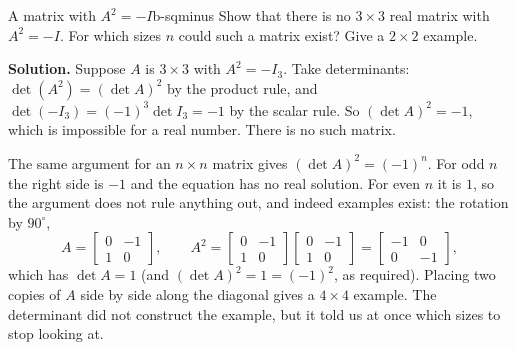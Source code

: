 \documentclass[11pt]{article}
\begin{document}
\begin{exmp}{A matrix with $A^2=-I$}{b-sqminus}
Show that there is no $3\times3$ real matrix with $A^2=-I$. For which sizes $n$ could such a matrix exist? Give a $2\times2$ example.

\textbf{Solution.} Suppose $A$ is $3\times3$ with $A^2=-I_3$. Take determinants: $\det(A^2)=(\det A)^2$ by the product rule, and $\det(-I_3)=(-1)^3\det I_3=-1$ by the scalar rule. So $(\det A)^2=-1$, which is impossible for a real number. There is no such matrix.

The same argument for an $n\times n$ matrix gives $(\det A)^2=(-1)^n$. For odd $n$ the right side is $-1$ and the equation has no real solution. For even $n$ it is $1$, so the argument does not rule anything out, and indeed examples exist: the rotation by $90^\circ$,
\[
A=\begin{bmatrix}0&-1\\1&0\end{bmatrix},\qquad A^2=\begin{bmatrix}0&-1\\1&0\end{bmatrix}\begin{bmatrix}0&-1\\1&0\end{bmatrix}=\begin{bmatrix}-1&0\\0&-1\end{bmatrix},
\]
which has $\det A=1$ (and $(\det A)^2=1=(-1)^2$, as required). Placing two copies of $A$ side by side along the diagonal gives a $4\times4$ example. The determinant did not construct the example, but it told us at once which sizes to stop looking at.
\end{exmp}
\end{document}
